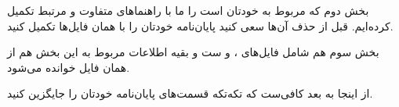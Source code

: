 بخش دوم که مربوط به خودتان است را ما با راهنماهای متفاوت و مرتبط تکمیل کرده‌ایم. قبل از حذف آن‌ها سعی کنید پایان‌نامه خودتان را با همان فایل‌ها تکمیل کنید.

بخش سوم هم شامل فایل‌های ،  و  ست و بقیه اطلاعات مربوط به این بخش هم از همان فایل  خوانده می‌شود.

از اینجا به بعد کافی‌ست که تکه‌تکه قسمت‌های پایان‌نامه خودتان را جایگزین کنید.